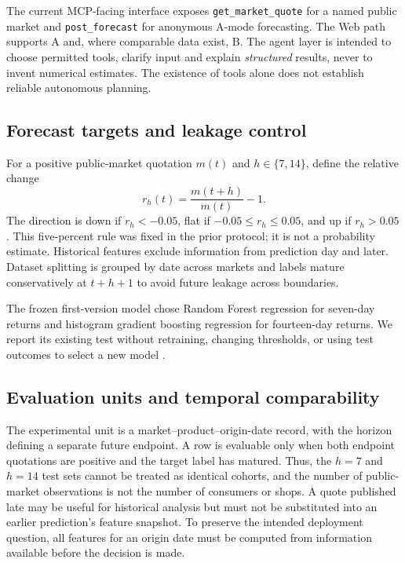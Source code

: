 \documentclass[conference]{IEEEtran}
\begin{document}
The current MCP-facing interface exposes \texttt{get\_market\_quote} for a named public market and \texttt{post\_forecast} for anonymous A-mode forecasting. The Web path supports A and, where comparable data exist, B. The agent layer is intended to choose permitted tools, clarify input and explain \emph{structured} results, never to invent numerical estimates. The existence of tools alone does not establish reliable autonomous planning.

\subsection{Forecast targets and leakage control}
For a positive public-market quotation $m(t)$ and $h\in\{7,14\}$, define the relative change
\begin{equation}
r_h(t)=\frac{m(t+h)}{m(t)}-1.
\end{equation}
The direction is down if $r_h<-0.05$, flat if $-0.05\leq r_h\leq0.05$, and up if $r_h>0.05$. This five-percent rule was fixed in the prior protocol; it is not a probability estimate. Historical features exclude information from prediction day and later. Dataset splitting is grouped by date across markets and labels mature conservatively at $t+h+1$ to avoid future leakage across boundaries.

The frozen first-version model chose Random Forest regression for seven-day returns and histogram gradient boosting regression for fourteen-day returns. We report its existing test without retraining, changing thresholds, or using test outcomes to select a new model \cite{fmpafrozen}.

\subsection{Evaluation units and temporal comparability}
The experimental unit is a market--product--origin-date record, with the horizon defining a separate future endpoint. A row is evaluable only when both endpoint quotations are positive and the target label has matured. Thus, the $h=7$ and $h=14$ test sets cannot be treated as identical cohorts, and the number of public-market observations is not the number of consumers or shops. A quote published late may be useful for historical analysis but must not be substituted into an earlier prediction's feature snapshot. To preserve the intended deployment question, all features for an origin date must be computed from information available before the decision is made.
\end{document}
